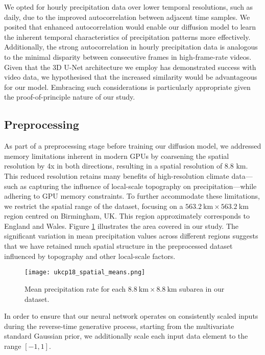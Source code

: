 \documentclass[ oneside,%
                    author={George Herbert},
                    degree={MSci},
                     title={Video Diffusion Models for Climate Simulations},
                  subtitle={}]{dissertation}
\begin{document}
We opted for hourly precipitation data over lower temporal resolutions, such as daily, due to the improved autocorrelation between adjacent time samples. We posited that enhanced autocorrelation would enable our diffusion model to learn the inherent temporal characteristics of precipitation patterns more effectively. Additionally, the strong autocorrelation in hourly precipitation data is analogous to the minimal disparity between consecutive frames in high-frame-rate videos. Given that the 3D U-Net architecture \cite{VDM_Ho} we employ has demonstrated success with video data, we hypothesised that the increased similarity would be advantageous for our model. Embracing such considerations is particularly appropriate given the proof-of-principle nature of our study.

\subsection{Preprocessing}

As part of a preprocessing stage before training our diffusion model, we addressed memory limitations inherent in modern GPUs by coarsening the spatial resolution by 4x in both directions, resulting in a spatial resolution of 8.8 km. This reduced resolution retains many benefits of high-resolution climate data---such as capturing the influence of local-scale topography on precipitation---while adhering to GPU memory constraints. To further accommodate these limitations, we restrict the spatial range of the dataset, focusing on a $563.2\ \mathrm{km}\times 563.2\ \mathrm{km}$ region centred on Birmingham, UK. This region approximately corresponds to England and Wales. Figure \ref{fig:ukcp18_spatial_means} illustrates the area covered in our study. The significant variation in mean precipitation values across different regions suggests that we have retained much spatial structure in the preprocessed dataset influenced by topography and other local-scale factors.

\begin{figure}[htbp]
      \centering
      \texttt{[image: ukcp18\_spatial\_means.png]}
      \caption{Mean precipitation rate for each $8.8\ \mathrm{km}\times 8.8\ \mathrm{km}$ subarea in our dataset.}
      \label{fig:ukcp18_spatial_means}
\end{figure}

In order to ensure that our neural network operates on consistently scaled inputs during the reverse-time generative process, starting from the multivariate standard Gaussian prior, we additionally scale each input data element to the range $[-1,1]$.
\end{document}
